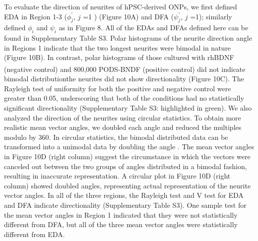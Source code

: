 \documentclass[review]{elsarticle}
\begin{document}
To evaluate the direction of neurites of hPSC-derived ONPs, we first defined EDA in Region 1-3 ($\phi^{\prime}_{j}$, $j$ =1 ) (Figure 10A) and DFA ($\psi^{\prime}_{j}$, $j$ =1); similarly defined $\phi_{i}$ and $\psi_{i}$ as in Figure 8. All of the EDAs and DFAs defined here can be found in Supplementary Table S3. Polar histograms of the neurite direction angle in Regions 1 indicate that the two longest neurites were bimodal in nature (Figure 10B).  In contrast, polar histograms of those cultured with rhBDNF (negative control) and 800,000 PODS\textsuperscript{\textregistered}-BNDF (positive control) did not indicate bimodal distribution\textemdash the neurites did not show directionality (Figure 10C). The Rayleigh test of uniformity for both the positive and negative control were greater than 0.05, underscoring that both of the conditions had no statistically significant directionality (Supplementary Table S3: highlighted in green). We also analyzed the direction of the neurites using circular statistics. To obtain more realistic mean vector angles, we doubled each angle and reduced the multiples modulo by 360\degree. In circular statistics, the bimodal distributed data can be transformed into a unimodal data by doubling the angle \cite{Batschelet1981}. The mean vector angles in Figure 10D (right column) suggest the circumstance in which the vectors were canceled out between the two groups of angles distributed in a bimodal fashion, resulting in inaccurate representation. A circular plot in Figure 10D (right column) showed doubled angles, representing actual representation of the neurite vector angles. In all of the three regions, the Rayleigh test and V test for EDA and DFA indicate directionality (Supplementary Table S3). One sample test for the mean vector angles in Region 1 indicated that they were not statistically different from DFA, but all of the three mean vector angles were statistically different from EDA.
\end{document}

